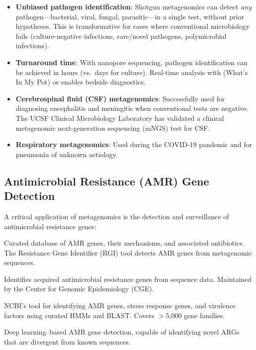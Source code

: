\begin{itemize}[nosep]
  \item \textbf{Unbiased pathogen identification}: Shotgun metagenomics can detect \emph{any} pathogen---bacterial, viral, fungal, parasitic---in a single test, without prior hypotheses. This is transformative for cases where conventional microbiology fails (culture-negative infections, rare/novel pathogens, polymicrobial infections).
  \item \textbf{Turnaround time}: With nanopore sequencing, pathogen identification can be achieved in hours (vs.\ days for culture). Real-time analysis with  (What's In My Pot) or  enables bedside diagnostics.
  \item \textbf{Cerebrospinal fluid (CSF) metagenomics}: Successfully used for diagnosing encephalitis and meningitis when conventional tests are negative. The UCSF Clinical Microbiology Laboratory has validated a clinical metagenomic next-generation sequencing (mNGS) test for CSF.
  \item \textbf{Respiratory metagenomics}: Used during the COVID-19 pandemic and for pneumonia of unknown aetiology.
\end{itemize}

\subsection{Antimicrobial Resistance (AMR) Gene Detection}

A critical application of metagenomics is the detection and surveillance of antimicrobial resistance genes:

\begin{description}[style=nextline]
  \item[CARD (Comprehensive Antibiotic Resistance Database)] Curated database of AMR genes, their mechanisms, and associated antibiotics. The Resistance Gene Identifier (RGI) tool detects AMR genes from metagenomic sequences.
  \item[ResFinder] Identifies acquired antimicrobial resistance genes from sequence data. Maintained by the Center for Genomic Epidemiology (CGE).
  \item[AMRFinderPlus] NCBI's tool for identifying AMR genes, stress response genes, and virulence factors using curated HMMs and BLAST. Covers $>$5,000 gene families.
  \item[deepARG] Deep learning--based AMR gene detection, capable of identifying novel ARGs that are divergent from known sequences.
\end{description}

